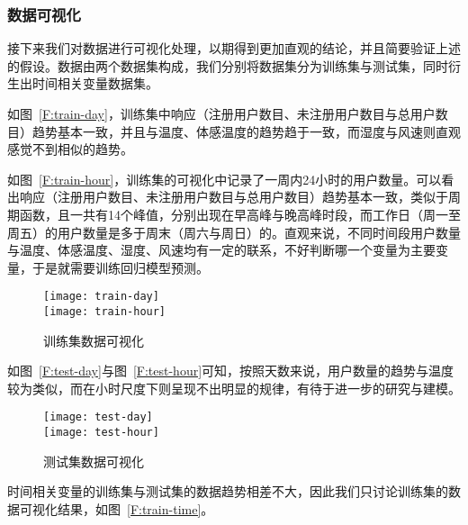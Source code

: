 \subsubsection{数据可视化}
接下来我们对数据进行可视化处理，以期得到更加直观的结论，并且简要验证上述的假设。数据由两个数据集构成，我们分别将数据集分为训练集与测试集，同时衍生出时间相关变量数据集。

如图~\ref{F:train-day}，训练集中响应（注册用户数目、未注册用户数目与总用户数目）趋势基本一致，并且与温度、体感温度的趋势趋于一致，而湿度与风速则直观感觉不到相似的趋势。

如图~\ref{F:train-hour}，训练集的可视化中记录了一周内24小时的用户数量。可以看出响应（注册用户数目、未注册用户数目与总用户数目）趋势基本一致，类似于周期函数，且一共有14个峰值，分别出现在早高峰与晚高峰时段，而工作日（周一至周五）的用户数量是多于周末（周六与周日）的。直观来说，不同时间段用户数量与温度、体感温度、湿度、风速均有一定的联系，不好判断哪一个变量为主要变量，于是就需要训练回归模型预测。
\begin{figure}[htbp]
    \centering
    \cprotect{}
        {\texttt{[image: train-day]}} \\
    \cprotect{}
        {\texttt{[image: train-hour]}}
    \caption{训练集数据可视化}\label{F:train}
\end{figure}

如图~\ref{F:test-day}与图~\ref{F:test-hour}可知，按照天数来说，用户数量的趋势与温度较为类似，而在小时尺度下则呈现不出明显的规律，有待于进一步的研究与建模。
\begin{figure}[htbp]
    \centering
    \cprotect{}
        {\texttt{[image: test-day]}} \\
    \cprotect{}
        {\texttt{[image: test-hour]}}
    \caption{测试集数据可视化}\label{F:test}
\end{figure}

时间相关变量的训练集与测试集的数据趋势相差不大，因此我们只讨论训练集的数据可视化结果，如图~\ref{F:train-time}。

